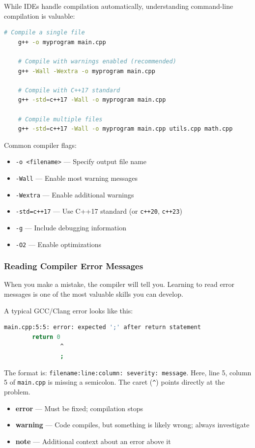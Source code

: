 While IDEs handle compilation automatically, understanding command-line compilation is valuable:

\begin{lstlisting}[language=bash,numbers=none]
	# Compile a single file
	g++ -o myprogram main.cpp
	
	# Compile with warnings enabled (recommended)
	g++ -Wall -Wextra -o myprogram main.cpp
	
	# Compile with C++17 standard
	g++ -std=c++17 -Wall -o myprogram main.cpp
	
	# Compile multiple files
	g++ -std=c++17 -Wall -o myprogram main.cpp utils.cpp math.cpp
\end{lstlisting}

Common compiler flags:
\begin{itemize}
	\item \texttt{-o <filename>} — Specify output file name
	\item \texttt{-Wall} — Enable most warning messages
	\item \texttt{-Wextra} — Enable additional warnings
	\item \texttt{-std=c++17} — Use C++17 standard (or \texttt{c++20}, \texttt{c++23})
	\item \texttt{-g} — Include debugging information
	\item \texttt{-O2} — Enable optimizations
\end{itemize}

\subsubsection{Reading Compiler Error Messages}

When you make a mistake, the compiler will tell you. Learning to read error messages is one of the most valuable skills you can develop.

A typical GCC/Clang error looks like this:

\begin{lstlisting}[language=bash,numbers=none]
	main.cpp:5:5: error: expected ';' after return statement
		return 0
		        ^
		        ;
\end{lstlisting}

The format is: \texttt{filename:line:column: severity: message}. Here, line 5, column 5 of \texttt{main.cpp} is missing a semicolon. The caret (\texttt{\^{}}) points directly at the problem.

\begin{itemize}
	\item \textbf{error} — Must be fixed; compilation stops
	\item \textbf{warning} — Code compiles, but something is likely wrong; always investigate
	\item \textbf{note} — Additional context about an error above it
\end{itemize}

